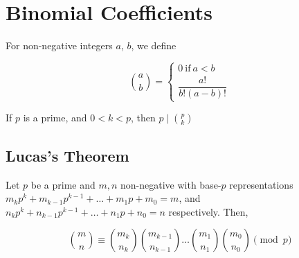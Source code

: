\chapter{Binomial Coefficients}

\begin{definition}
    For non-negative integers $a$, $b$, we define

    \[
    \binom{a}{b}=
    \begin{cases}
        0 \ \text{if} \ a<b\\
        \dfrac{a!}{b!(a-b)!}
    \end{cases}
    \]
    
\end{definition}

\begin{lemma}
    If $p$ is a prime, and $0<k<p$, then $p \mid \binom{p}{k}$
\end{lemma}

\section{Lucas's Theorem}

\begin{theorem}
    Let $p$ be a prime and $m, n$ non-negative with base-$p$ representations $m_k p^k+m_{k-1}p^{k-1}+\dots+m_1 p+m_0=m$, and $n_k p^k+n_{k-1}p^{k-1}+\dots+n_1 p+n_0=n$ respectively. Then,

    \[
    \binom{m}{n} \equiv \binom{m_k}{n_k}\binom{m_{k-1}}{n_{k-1}}\dots\binom{m_1}{n_1}\binom{m_0}{n_0} \pmod p
    \]

\end{theorem}


